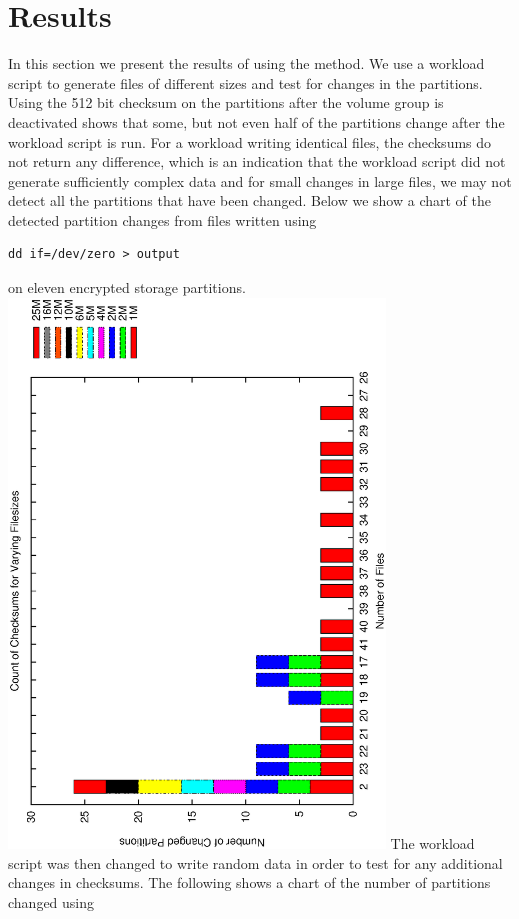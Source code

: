 \documentclass[12pt]{article}
\begin{document}
\section{Results}
In this section we present the results of using the method. We use a workload script to generate files of different sizes and test for changes in the partitions. Using the 512 bit checksum on the partitions after the volume group is deactivated shows that some, but not even half of the partitions change after the workload script is run. For a workload writing identical files, the checksums do not return any difference, which is an indication that the workload script did not generate sufficiently complex data and for small changes in large files, we may not detect all the partitions that have been changed. Below we show a chart of the detected partition changes from files written using 
\begin{verbatim}
dd if=/dev/zero > output
\end{verbatim}
on eleven encrypted storage partitions.\\
\includegraphics[width=10cm,angle=-90]{count.eps}
The workload script was then changed to write random data in order to test for any additional changes in checksums. The following shows a chart of the number of partitions changed using 
\end{document}

